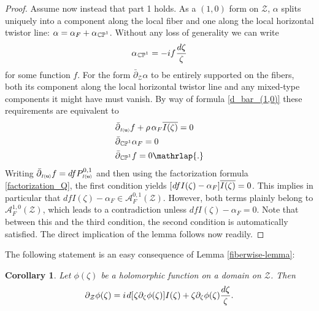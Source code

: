 \documentclass[11pt]{amsart}
\newtheorem{corollary}[theorem]{Corollary}
\theoremstyle{remark}
\theoremstyle{remark}
\theoremstyle{definition}
\theoremstyle{definition}
\theoremstyle{definition}
\newcommand{\Iu}{\scriptscriptstyle{I\nhp(\nhp\mathbf{u}\hspace{-0.25pt})}} %
\newcommand{\0}{{\scriptstyle 0'}} %
\newcommand{\1}{{\scriptstyle 1'}}
\newcommand{\pt}{\hspace{1pt}} %
\newcommand{\hp}{\hspace{0.5pt}} %
\newcommand{\nhp}{\hspace{-0.5pt}} %
\begin{document}
\begin{proof}
Assume now instead that part 1 holds. As a $(1,0)$ form on $\mathcal{Z}$, $\alpha$ splits uniquely into a component along the local fiber and one along the local horizontal twistor line: \mbox{$\alpha = \alpha_F + \alpha_{\hp\smash{\mathbb{CP}^1}}$.} Without any loss of generality we can write
\begin{equation}
\alpha_{\hp\smash{\mathbb{CP}^1}} = -i f \hp \frac{d\zeta}{\zeta}
\end{equation}
for some function $f$. For the form $\bar{\partial}_{\mathcal{Z}}\alpha$ to be entirely supported on the fibers, both its component along the local horizontal twistor line and any mixed-type components it might have must vanish. By way of formula \eqref{d_bar_(1,0)} these requirements are equivalent to
{\allowdisplaybreaks
\begin{equation}
\begin{aligned}
& \bar{\partial}_{\Iu} f +  \rho \pt\hp \alpha_F \overline{I(\zeta)} = 0 \\
& \bar{\partial}_{\hp\smash{\mathbb{CP}^1}} \alpha_F = 0 \\[0pt]
& \bar{\partial}_{\hp\smash{\mathbb{CP}^1}} f = 0 \mathrlap{.}
\end{aligned}
\end{equation}
}%
Writing $\bar{\partial}_{\Iu} f = df P^{0,1}_{\Iu}$ and then using the factorization formula \eqref{factorization_Q}, the first condition yields $[\hp df I(\zeta) - \alpha_F] \overline{I(\zeta)} = 0$. This implies in particular that \mbox{$df I(\zeta)- \alpha_F \in \mathscr{A}^{0,1}_F(\mathcal{Z})$.} However, both terms plainly belong to $\mathscr{A}^{1,0}_F(\mathcal{Z})$, which leads to a contradiction unless $df I(\zeta)- \alpha_F = 0$. Note that between this and the third condition, the second condition is automatically satisfied. The direct implication of the lemma follows now readily.
\end{proof}

The following statement is an easy consequence of Lemma \ref{fiberwise-lemma}: 

\begin{corollary}
Let $\phi(\zeta)$ be a holomorphic function on a domain on $\mathcal{Z}$. Then
\begin{equation} \label{delZ_hol}
\partial_{\mathcal{Z}}\phi(\zeta) = i\pt d[\hp \zeta\partial_{\zeta}\phi(\zeta)]I(\zeta) + \zeta\partial_{\zeta}\phi(\zeta) \frac{d\zeta}{\zeta}.
\end{equation}
\end{corollary}
\end{document}
